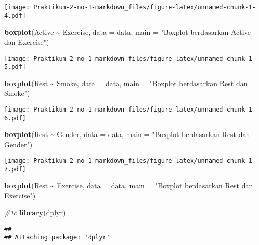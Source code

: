 \documentclass[
]{article}
\newenvironment{Shaded}{\begin{snugshade}}{\end{snugshade}}
\newcommand{\AttributeTok}[1]{\textcolor[rgb]{0.13,0.29,0.53}{#1}}
\newcommand{\CommentTok}[1]{\textcolor[rgb]{0.56,0.35,0.01}{\textit{#1}}}
\newcommand{\FunctionTok}[1]{\textcolor[rgb]{0.13,0.29,0.53}{\textbf{#1}}}
\newcommand{\NormalTok}[1]{#1}
\newcommand{\SpecialCharTok}[1]{\textcolor[rgb]{0.81,0.36,0.00}{\textbf{#1}}}
\newcommand{\StringTok}[1]{\textcolor[rgb]{0.31,0.60,0.02}{#1}}
\begin{document}
\texttt{[image: Praktikum-2-no-1-markdown\_files/figure-latex/unnamed-chunk-1-4.pdf]}

\begin{Shaded}
\begin{Highlighting}[]
\FunctionTok{boxplot}\NormalTok{(Active }\SpecialCharTok{\textasciitilde{}}\NormalTok{ Exercise, }\AttributeTok{data =}\NormalTok{ data, }\AttributeTok{main =} \StringTok{"Boxplot berdasarkan Active dan Exercise"}\NormalTok{)}
\end{Highlighting}
\end{Shaded}

\texttt{[image: Praktikum-2-no-1-markdown\_files/figure-latex/unnamed-chunk-1-5.pdf]}

\begin{Shaded}
\begin{Highlighting}[]
\FunctionTok{boxplot}\NormalTok{(Rest }\SpecialCharTok{\textasciitilde{}}\NormalTok{ Smoke, }\AttributeTok{data =}\NormalTok{ data, }\AttributeTok{main =} \StringTok{"Boxplot berdasarkan Rest dan Smoke"}\NormalTok{)}
\end{Highlighting}
\end{Shaded}

\texttt{[image: Praktikum-2-no-1-markdown\_files/figure-latex/unnamed-chunk-1-6.pdf]}

\begin{Shaded}
\begin{Highlighting}[]
\FunctionTok{boxplot}\NormalTok{(Rest }\SpecialCharTok{\textasciitilde{}}\NormalTok{ Gender, }\AttributeTok{data =}\NormalTok{ data, }\AttributeTok{main =} \StringTok{"Boxplot berdasarkan Rest dan Gender"}\NormalTok{)}
\end{Highlighting}
\end{Shaded}

\texttt{[image: Praktikum-2-no-1-markdown\_files/figure-latex/unnamed-chunk-1-7.pdf]}

\begin{Shaded}
\begin{Highlighting}[]
\FunctionTok{boxplot}\NormalTok{(Rest }\SpecialCharTok{\textasciitilde{}}\NormalTok{ Exercise, }\AttributeTok{data =}\NormalTok{ data, }\AttributeTok{main =} \StringTok{"Boxplot berdasarkan Rest dan Exercise"}\NormalTok{)}

\CommentTok{\#1c}
\FunctionTok{library}\NormalTok{(dplyr)}
\end{Highlighting}
\end{Shaded}

\begin{verbatim}
## 
## Attaching package: 'dplyr'
\end{verbatim}
\end{document}
